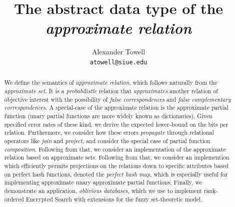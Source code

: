 \documentclass[11pt,final,hidelinks]{article}
\title
{
    The abstract data type of the \emph{approximate relation}
}
\author
{
    Alexander Towell\\
    \texttt{atowell@siue.edu}
}
\date{}
\begin{document}
\maketitle
\begin{abstract}
We define the semantics of \emph{approximate relation}, which follows naturally from the \emph{approximate set}. It is a \emph{probabilistic} relation that \emph{approximates} another relation of objective interest with the possibility of \emph{false correspondences} and \emph{false complementary correspondences}. A special-case of the approximate relation is the approximate partial function (unary partial functions are more widely known as dictionaries). Given specified error rates of these kind, we derive the expected lower-bound on the bits per relation. Furthermore, we consider how these errors \emph{propagate} through relational operators like \emph{join} and \emph{project}, and consider the special case of partial function \emph{composition}. Following from that, we consider an implementation of the approximate relation based on approximate sets. Following from that, we consider an implemention which efficiently permits projections on the relations down to specific attributes based on perfect hash functions, denoted the \emph{perfect hash map}, which is especially useful for implementing approximate unary approximate partial functions. Finally, we demonstrate an application, \emph{oblivious databases}, which we use to implement rank-ordered Encrypted Search with extensions for the fuzzy set-theoretic model.
\end{abstract}


\tableofcontents
{}


\newcommand{\ExactMap}[1]{M(#1)}




% 
% 
%
\end{document}
